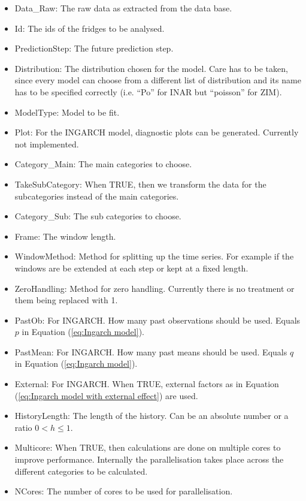 \begin{itemize}
	\item Data\_Raw: The raw data as extracted from the data base.
  \item Id: The ids of the fridges to be analysed.
  \item PredictionStep: The future prediction step.
  \item Distribution: The distribution chosen for the model. Care has to be taken, since every model can choose from a different list of distribution and its name has to be specified correctly (i.e. "`Po"' for INAR but "`poisson"' for ZIM).
  \item ModelType: Model to be fit. 
  \item Plot: For the INGARCH model, diagnostic plots can be generated. Currently not implemented.
  \item Category\_Main: The main categories to choose. 
  \item TakeSubCategory: When TRUE, then we transform the data for the subcategories instead of the main categories. 
  \item Category\_Sub: The sub categories to choose.
  \item Frame: The window length.
  \item WindowMethod: Method for splitting up the time series. For example if the windows are be extended at each step or kept at a fixed length.
  \item ZeroHandling: Method for zero handling. Currently there is no treatment or them being replaced with 1. 
  \item PastOb: For INGARCH. How many past observations should be used. Equals $p$ in Equation (\ref{eq:Ingarch model}).
  \item PastMean: For INGARCH. How many past means should be used. Equals $q$ in Equation (\ref{eq:Ingarch model}).
  \item External: For INGARCH. When TRUE, external factors as in Equation (\ref{eq:Ingarch model with external effect}) are used.
  \item HistoryLength: The length of the history. Can be an absolute number or a ratio $0<h\leq 1$.
  \item Multicore: When TRUE, then calculations are done on multiple cores to improve performance. Internally the parallelisation takes place across the different categories to be calculated. 
  \item NCores: The number of cores to be used for parallelisation. 
\end{itemize}

